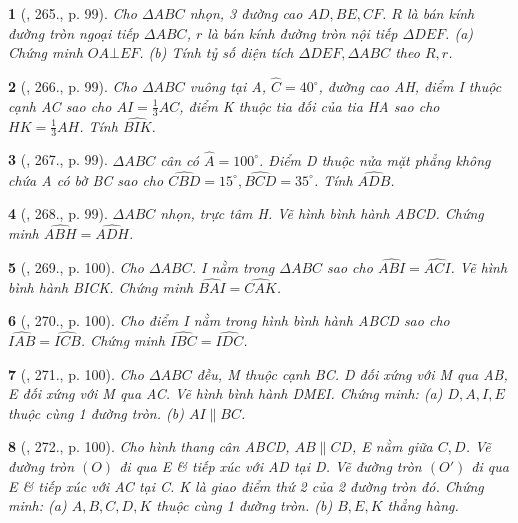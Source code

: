 \documentclass{article}
\newtheorem{baitoan}{}
\begin{document}
\begin{baitoan}[\cite{Binh_Toan_9_tap_2}, 265., p. 99]
	Cho $\Delta ABC$ nhọn, 3 đường cao $AD,BE,CF$. $R$ là bán kính đường tròn ngoại tiếp $\Delta ABC$, $r$ là bán kính đường tròn nội tiếp $\Delta DEF$. (a) Chứng minh $OA\bot EF$. (b) Tính tỷ số diện tích $\Delta DEF,\Delta ABC$ theo $R,r$.
\end{baitoan}

\begin{baitoan}[\cite{Binh_Toan_9_tap_2}, 266., p. 99]
	Cho $\Delta ABC$ vuông tại A, $\widehat{C} = 40^\circ$, đường cao AH, điểm I thuộc cạnh AC sao cho $AI = \frac{1}{3}AC$, điểm K thuộc tia đối của tia HA sao cho $HK = \frac{1}{3}AH$. Tính $\widehat{BIK}$.
\end{baitoan}

\begin{baitoan}[\cite{Binh_Toan_9_tap_2}, 267., p. 99]
	$\Delta ABC$ cân có $\widehat{A} = 100^\circ$. Điểm D thuộc nửa mặt phẳng không chứa A có bờ BC sao cho $\widehat{CBD} = 15^\circ,\widehat{BCD} = 35^\circ$. Tính $\widehat{ADB}$.
\end{baitoan}

\begin{baitoan}[\cite{Binh_Toan_9_tap_2}, 268., p. 99]
	$\Delta ABC$ nhọn, trực tâm H. Vẽ hình bình hành ABCD. Chứng minh $\widehat{ABH} = \widehat{ADH}$.
\end{baitoan}

\begin{baitoan}[\cite{Binh_Toan_9_tap_2}, 269., p. 100]
	Cho $\Delta ABC$. I nằm trong $\Delta ABC$ sao cho $\widehat{ABI} = \widehat{ACI}$. Vẽ hình bình hành BICK. Chứng minh $\widehat{BAI} = \widehat{CAK}$.
\end{baitoan}

\begin{baitoan}[\cite{Binh_Toan_9_tap_2}, 270., p. 100]
	Cho điểm I nằm trong hình bình hành ABCD sao cho $\widehat{IAB} = \widehat{ICB}$. Chứng minh $\widehat{IBC} = \widehat{IDC}$.
\end{baitoan}

\begin{baitoan}[\cite{Binh_Toan_9_tap_2}, 271., p. 100]
	Cho $\Delta ABC$ đều, M thuộc cạnh BC. D đối xứng với M qua AB, E đối xứng với M qua AC. Vẽ hình bình hành DMEI. Chứng minh: (a) $D,A,I,E$ thuộc cùng 1 đường tròn. (b) $AI\parallel BC$.
\end{baitoan}

\begin{baitoan}[\cite{Binh_Toan_9_tap_2}, 272., p. 100]
	Cho hình thang cân ABCD, $AB\parallel CD$, E nằm giữa $C,D$. Vẽ đường tròn $(O)$ đi qua E \& tiếp xúc với AD tại D. Vẽ đường tròn $(O')$ đi qua E \& tiếp xúc với AC tại C. K là giao điểm thứ 2 của 2 đường tròn đó. Chứng minh: (a) $A,B,C,D,K$ thuộc cùng 1 đường tròn. (b) $B,E,K$ thẳng hàng.
\end{baitoan}
\end{document}
